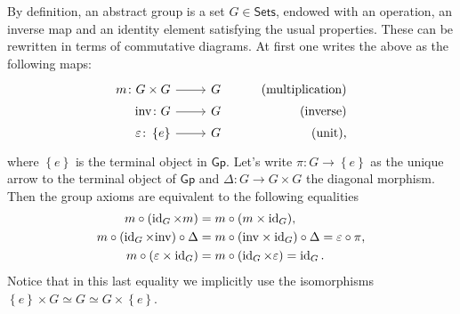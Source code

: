 \begin{rem}[]
	By definition, an abstract group is a set $G \in \mathsf{Sets}$, endowed with an operation,
	an inverse map and an identity element satisfying the usual properties.
	These can be rewritten in terms of commutative diagrams.
	At first one writes the above as the following maps:
	\begin{equation*}
	\begin{tikzcd}[row sep = 0ex
         ,/tikz/column 1/.append style={anchor=base east}
         ,/tikz/column 2/.append style={anchor=base west}
         ,/tikz/column 3/.append style={anchor=base east}]
			m\colon G \times G \arrow[r, "", rightarrow] &
			G & \text{(multiplication)} \\
			\mathrm{inv}\colon G \arrow[r, "", rightarrow] &
			G & \text{(inverse)} \\
			\varepsilon \colon \left\{ e \right\} \arrow[r, "", rightarrow] &
			G & \text{(unit),}
		\end{tikzcd}
	\end{equation*} 
	where $\left\{ e \right\}$ is the terminal object in $\mathsf{Gp}$.
	Let's write $\pi\colon G \to \left\{ e \right\}$
	as the unique arrow to the terminal object of $\mathsf{Gp}$
	and $\Delta\colon G \to G \times G$ the diagonal morphism.
	Then the group axioms are equivalent to
	the following equalities
	\begin{align}\label{eq:GroupAxioms}
		m \circ (\operatorname{id}_{ G } \times m) &= m \circ (m \times \operatorname{id}_{ G }),\nonumber\\
		m \circ (\operatorname{id}_{ G } \times \mathrm{inv}) \circ \Delta &=
		m \circ (\mathrm{inv} \times \operatorname{id}_{ G }) \circ \Delta = \varepsilon \circ \pi,\\
		m \circ (\varepsilon \times \operatorname{id}_{ G }) &=
		m \circ (\operatorname{id}_{ G } \times \varepsilon) = \operatorname{id}_{ G }\nonumber
	.\end{align} 
	Notice that in this last equality we implicitly use the isomorphisms
	$\left\{ e \right\} \times G \simeq G \simeq G \times \left\{ e \right\}$.
\end{rem}


